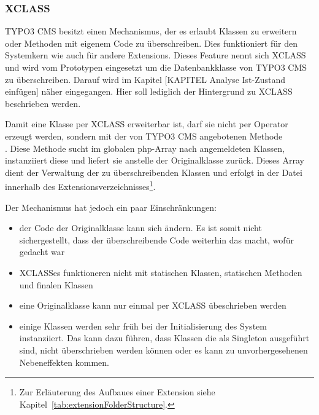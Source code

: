 \subsubsection{XCLASS}
TYPO3 CMS besitzt einen Mechanismus, der es erlaubt Klassen zu erweitern oder Methoden mit eigenem Code zu überschreiben. Dies funktioniert für den Systemkern wie auch für andere Extensions. Dieses Feature nennt sich XCLASS und wird vom Prototypen eingesetzt um die Datenbankklasse von TYPO3 CMS zu überschreiben. Darauf wird im Kapitel [KAPITEL Analyse Ist-Zustand einfügen] näher eingegangen. Hier soll lediglich der Hintergrund zu XCLASS beschrieben werden.

Damit eine Klasse per XCLASS erweiterbar ist, darf sie nicht per  Operator erzeugt werden, sondern mit der von TYPO3 CMS angebotenen Methode\\
.
Diese Methode sucht im globalen \gls{php}-Array  nach angemeldeten Klassen, instanziiert diese und liefert sie anstelle der Originalklasse zurück. Dieses Array dient der Verwaltung der zu überschreibenden Klassen und erfolgt in der Datei  innerhalb des Extensionsverzeichnisses\footnote{Zur Erläuterung des Aufbaues einer Extension siehe Kapitel~\ref{tab:extensionFolderStructure}.}.


Der Mechanismus hat jedoch ein paar Einschränkungen:

\begin{itemize}
	\itemsep1pt\parskip0pt
	\item
		der Code der Originalklasse kann sich ändern. Es ist somit nicht sichergestellt, dass der überschreibende Code weiterhin das macht, wofür gedacht war
	\item
		XCLASSes funktioneren nicht mit statischen Klassen, statischen Methoden und finalen Klassen
	\item
		eine Originalklasse kann nur einmal per XCLASS übeschrieben werden
	\item
		einige Klassen werden sehr früh bei der Initialisierung des System instanziiert. Das kann dazu führen, dass Klassen die als Singleton ausgeführt sind, nicht überschrieben werden können oder es kann zu unvorhergesehenen Nebeneffekten kommen.
\end{itemize}

